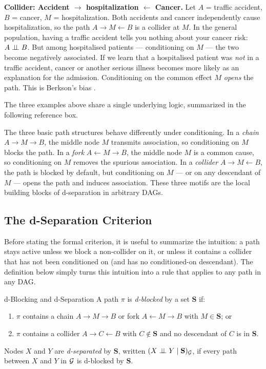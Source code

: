 \documentclass[master.tex]{subfiles}
\begin{document}
\medskip
\noindent\textbf{Collider: Accident $\to$ hospitalization $\leftarrow$ Cancer.}
Let $A$ = traffic accident, $B$ = cancer, $M$ = hospitalization.
Both accidents and cancer independently cause hospitalization, so the path
$A \to M \leftarrow B$ is a collider at $M$.
In the general population, having a traffic accident tells you nothing about
your cancer risk: $A \perp\!\!\!\perp B$.
But among hospitalised patients --- conditioning on $M$ --- the two become
negatively associated.
If we learn that a hospitalised patient was \emph{not} in a traffic accident,
cancer or another serious illness becomes more likely as an explanation for
the admission.
Conditioning on the common effect $M$ \emph{opens} the path.
This is Berkson's bias \citep{berkson1946limitations}.

\medskip
The three examples above share a single underlying logic, summarized in
the following reference box.

\begin{tcolorbox}[defstyle, title={Three-Node Motifs at a Glance}]
The three basic path structures behave differently under conditioning.
In a \emph{chain} $A \to M \to B$, the middle node $M$ transmits
association, so conditioning on $M$ blocks the path.
In a \emph{fork} $A \leftarrow M \to B$, the middle node $M$ is a common
cause, so conditioning on $M$ removes the spurious association.
In a \emph{collider} $A \to M \leftarrow B$, the path is blocked by
default, but conditioning on $M$ --- or on any descendant of $M$ ---
opens the path and induces association.
These three motifs are the local building blocks of d-separation in
arbitrary DAGs.
\end{tcolorbox}

\subsection{The d-Separation Criterion}

Before stating the formal criterion, it is useful to summarize the
intuition: a path stays active unless we block a non-collider on it,
or unless it contains a collider that has not been conditioned on (and
has no conditioned-on descendant).
The definition below simply turns this intuition into a rule that applies
to any path in any DAG.

\begin{defn}{d-Blocking and d-Separation}
\label{w2:def:dsep}
A path $\pi$ is \emph{d-blocked} by a set $\mathbf{S}$ if:
\begin{enumerate}
  \item $\pi$ contains a chain $A \to M \to B$ or fork $A \leftarrow M \to B$
        with $M \in \mathbf{S}$; or
  \item $\pi$ contains a collider $A \to C \leftarrow B$ with $C \notin
        \mathbf{S}$ and no descendant of $C$ is in $\mathbf{S}$.
\end{enumerate}
Nodes $X$ and $Y$ are \emph{d-separated} by $\mathbf{S}$, written
$(X \perp\!\!\!\perp Y \mid \mathbf{S})_{\mathcal{G}}$, if every path between
$X$ and $Y$ in $\mathcal{G}$ is d-blocked by $\mathbf{S}$.
\end{defn}
\end{document}

